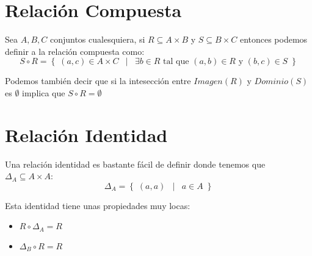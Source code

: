 \documentclass[12pt, fleqn]{report}                             %
\DeclareMathOperator \Space     {\quad}                         %
\DeclareMathOperator \MiniSpace {\;}                            %
\newcommand \Such           {\MiniSpace | \MiniSpace}           %
\theoremstyle{break}                                            %
\newcommand{\Set}[1]            {\left\{ \; #1 \; \right\}}     %
\begin{document}
        \section{Relación Compuesta}

            Sea $A, B, C$ conjuntos cualesquiera, si $R \subseteq A \times B$ 
            y $S \subseteq B \times C$ entonces podemos definir a la relación
            compuesta como:            
            \begin{equation*}
                S \circ R = \Set{ (a,c) \in A \times C \Such
                        \exists b \in R \text{ tal que } 
                            (a,b) \in R \text{ y } (b, c) \in S
                    }
            \end{equation*}

            Podemos también decir que si la intesección entre $Imagen(R)$ y
            $Dominio(S)$ es $\emptyset$ implica que $S \circ R = \emptyset$


        \section{Relación Identidad}

            Una relación identidad es bastante fácil de definir donde tenemos
            que $\Delta_{A} \subseteq A \times A$:
            \begin{equation*}
                \Delta_{A} = \Set{ (a, a) \Such a \in A }
            \end{equation*}

            Esta identidad tiene unas propiedades muy locas:
            \begin{itemize}
                \item $R \circ \Delta_{A} = R$
                \item $\Delta_{B} \circ R = R$
            \end{itemize}







        \clearpage
\end{document}
